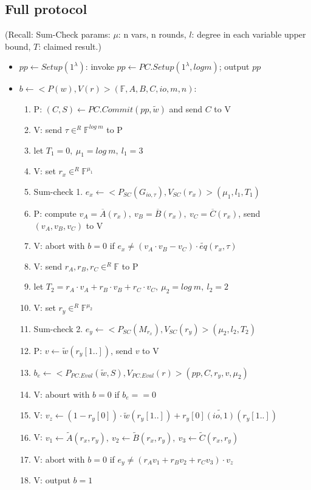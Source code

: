 \documentclass{article}
\theoremstyle{definition}
\begin{document}
\subsection{Full protocol}
\begin{footnotesize}
	(Recall: Sum-Check params: $\mu$: n vars, n rounds, $l$: degree in each variable upper bound, $T$: claimed result.)
\end{footnotesize}

\begin{itemize}
	\item $pp \leftarrow Setup(1^{\lambda})$: invoke $pp \leftarrow PC.Setup(1^{\lambda}, log m)$; output $pp$
	\item $b \leftarrow <P(w), V(r)>(\mathbb{F}, A,B,C, io, m, n)$:
	\begin{enumerate}
		\item P: $(C, S) \leftarrow PC.Commit(pp, \widetilde{w})$ and send $C$ to V
		\item V: send $\tau \in^R \mathbb{F}^{log~m}$ to P
		\item let $T_1=0,~ \mu_1=log~m,~ l_1=3$
		\item V: set $r_x \in^R \mathbb{F}^{\mu_1}$
		\item Sum-check 1. $e_x \leftarrow <P_{SC}(G_{io,\tau}), V_{SC}(r_x)>(\mu_1, l_1, T_1)$
		\item P: compute $v_A=\overline{A}(r_x),~ v_B=\overline{B}(r_x),~ v_C=\overline{C}(r_x)$, send $(v_A, v_B, v_C)$ to V
		\item V: abort with $b=0$ if $e_x \neq (v_A \cdot v_B - v_C)\cdot \widetilde{eq}(r_x, \tau)$
		\item V: send $r_A, r_B, r_C \in^R \mathbb{F}$ to P
		\item let $T_2 = r_A \cdot v_A + r_B \cdot v_B + r_C \cdot v_C,~ \mu_2=log~m,~ l_2=2$
		\item V: set $r_y \in^R \mathbb{F}^{\mu_2}$
		\item Sum-check 2. $e_y \leftarrow <P_{SC}(M_{r_x}), V_{SC}(r_y)>(\mu_2, l_2, T_2)$
		\item P: $v \leftarrow \widetilde{w}(r_y[1..])$, send $v$ to V
		\item $b_e \leftarrow <P_{PC.Eval}(\widetilde{w}, S), V_{PC.Eval}(r)>(pp,  C, r_y, v, \mu_2)$
		\item V: abourt with $b=0$ if $b_e==0$
		\item V: $v_z \leftarrow (1 - r_y[0]) \cdot \widetilde{w}(r_y [1..]) + r_y[0] \widetilde{(io, 1)} (r_y[1..])$
		\item V: $v_1 \leftarrow \widetilde{A}(r_x, r_y),~ v_2 \leftarrow \widetilde{B}(r_x, r_y),~ v_3 \leftarrow \widetilde{C}(r_x, r_y)$
		\item V: abort with $b=0$ if $e_y \neq (r_A v_1 + r_B v_2 + r_C v_3) \cdot v_z$
		\item V: output $b=1$
	\end{enumerate}
\end{itemize}
\end{document}
